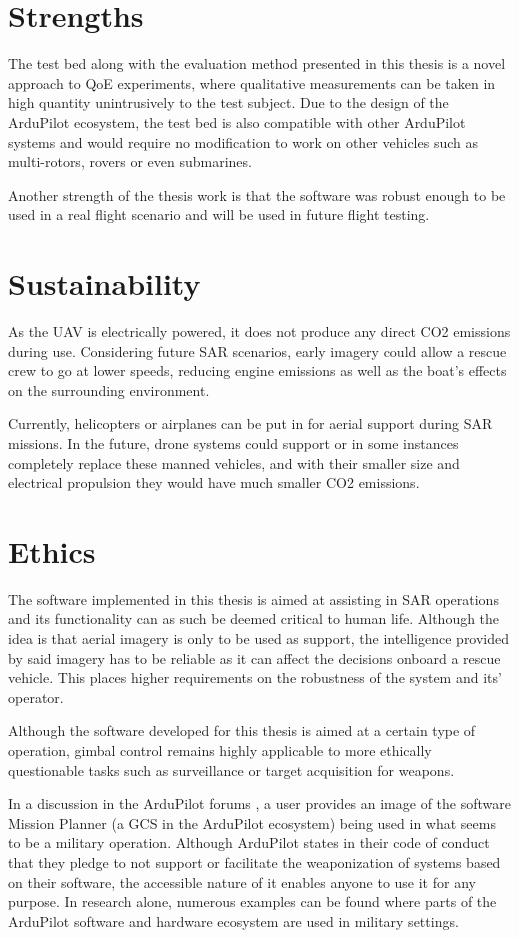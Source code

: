 \documentclass[nofilelist]{cslthse-msc}
\begin{document}
\section{Strengths}
The test bed along with the evaluation method presented in this thesis is a novel approach to QoE experiments, where qualitative measurements can be taken in high quantity unintrusively to the test subject. Due to the design of the ArduPilot ecosystem, the test bed is also compatible with other ArduPilot systems and would require no modification to work on other vehicles such as multi-rotors, rovers or even submarines.

Another strength of the thesis work is that the software was robust enough to be used in a real flight scenario and will be used in future flight testing.

\section{Sustainability}
As the UAV is electrically powered, it does not produce any direct CO2 emissions during use. Considering future SAR scenarios, early imagery could allow a rescue crew to go at lower speeds, reducing engine emissions as well as the boat's effects on the surrounding environment. 

Currently, helicopters or airplanes can be put in for aerial support during SAR missions. In the future, drone systems could support or in some instances completely replace these manned vehicles, and with their smaller size and electrical propulsion they would have much smaller CO2 emissions.

\section{Ethics}
The software implemented in this thesis is aimed at assisting in SAR operations and its functionality can as such be deemed critical to human life. Although the idea is that aerial imagery is only to be used as support, the intelligence provided by said imagery has to be reliable as it can affect the decisions onboard a rescue vehicle. This places higher requirements on the robustness of the system and its' operator. 

Although the software developed for this thesis is aimed at a certain type of operation, gimbal control remains highly applicable to more ethically questionable tasks such as surveillance or target acquisition for weapons. 

In a discussion in the ArduPilot forums \cite{ardupilot-military-discussion}, a user provides an image of the software Mission Planner (a GCS in the ArduPilot ecosystem) being used in what seems to be a military operation. Although ArduPilot states in their code of conduct \cite{ardupilot-coc} that they pledge to not support or facilitate the weaponization of systems based on their software, the accessible nature of it enables anyone to use it for any purpose. In research alone, numerous examples can be found \cite{ardupilot-military} \cite{ardupilot-military-1} where parts of the ArduPilot software and hardware ecosystem are used in military settings.
\end{document}
